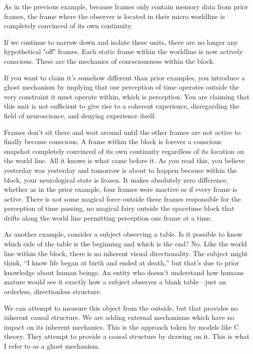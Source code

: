 \documentclass[11pt,a4paper]{article}
\begin{document}
As in the previous example, because frames only contain memory data from prior frames, the frame where the observer is located in their micro worldline is completely convinced of its own continuity.

If we continue to narrow down and isolate these units, there are no longer any hypothetical "off" frames. Each static frame within the worldline is now actively conscious. These are the mechanics of concsciousness within the block. 

If you want to claim it's somehow different than prior examples, you introduce a ghost mechanism by implying that our perception of time operates outside the very constraint it must operate within, which is perception. You are claiming that this unit is not sufficient to give rise to a coherent experience, disregarding the field of neuroscience, and denying experience itself.

Frames don't sit there and wait around until the other frames are not active to finally become conscious. A frame within the block is forever a conscious snapshot completely convinced of its own continuity regardless of its location on the world line. All it knows is what came before it. As you read this, you believe yesterday was yesterday and tomorrow is about to happen because within the block, your neurological state is frozen. It makes absolutely zero difference, whether as in the prior example, four frames were inactive or if every frame is active. There is not some magical force outside these frames responsible for the perception of time passing, no magical fairy outside the spacetime block that drifts along the world line permitting perception one frame at a time.

As another example, consider a subject observing a table. Is it possible to know which side of the table is the beginning and which is the end? No. Like the world line within the block, there is no inherent visual directionality. The subject might think, “I know life began at birth and ended at death,” but that's due to prior knowledge about human beings. An entity who doesn't understand how humans mature would see it exactly how a subject observes a blank table—just an orderless, directionless structure.

We can attempt to measure this object from the outside, but that provides no inherent causal structure. We are adding external mechanisms which have no impact on its inherent mechanics. This is the approach taken by models like C theory. They attempt to provide a causal structure by drawing on it. This is what I refer to as a ghost mechanism.
\end{document}
